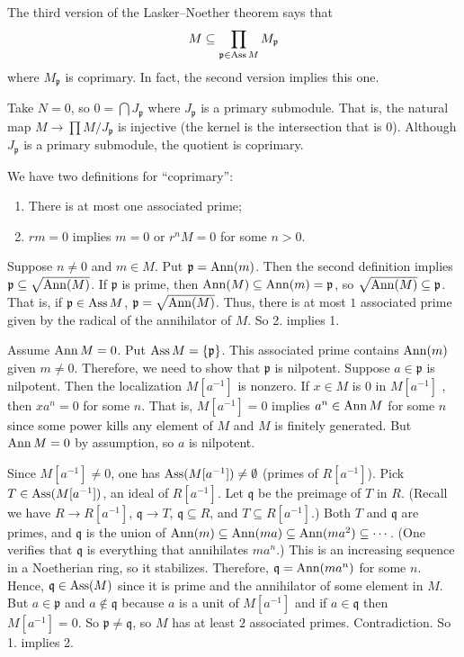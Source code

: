 \documentclass[11pt, oneside,margin=1in]{article}
\begin{document}
The third version of the Lasker--Noether theorem says that
\begin{align*}
	M \subseteq \prod_{\mathfrak{p}\in \operatorname{Ass} M} M_{\mathfrak{p}}
\end{align*}
where $M_{\mathfrak{p}}$ is coprimary. In fact, the second version implies this one. 

Take $N=0$, so $0 = \bigcap J_{\mathfrak{p} }$ where $J_{\mathfrak{p}}$ is a primary submodule. That is, the natural map $M \longrightarrow \prod M/J_{\mathfrak{p}}$ is injective (the kernel is the intersection that is $0$). Although $J_{\mathfrak{p}}$ is a primary submodule, the quotient is coprimary.

We have two definitions for ``coprimary'':
\begin{enumerate}
	\item There is at most one associated prime;
	\item $rm = 0$ implies $m=0$ or $r^nM=0$ for some $n>0$.
\end{enumerate}

Suppose $n\ne 0$ and $m\in M$. Put $\mathfrak{p} = \operatorname{Ann}(m)$. Then the second definition implies $\mathfrak{p} \subseteq \sqrt{\operatorname{Ann} (M)} $. If $\mathfrak{p}$ is prime, then $\operatorname{Ann}(M)\subseteq \operatorname{Ann} (m)= \mathfrak{p}$, so $\sqrt{\operatorname{Ann}(M)}\subseteq \mathfrak{p} $. That is, if $\mathfrak{p}\in \operatorname{Ass} M$, $\mathfrak{p} = \sqrt{\operatorname{Ann} (M)} $. Thus, there is at most $1$ associated prime given by the radical of the annihilator of $M$. So 2. implies 1.

Assume $\operatorname{Ann} M=0$. Put $\operatorname{Ass} M = \{\mathfrak{p}\}$. This associated prime contains $\operatorname{Ann} (m)$ given $m\ne 0$. Therefore, we need to show that $\mathfrak{p}$ is nilpotent. Suppose $a\in \mathfrak{p}$ is nilpotent. Then the localization $M[a^{-1}]$ is nonzero. If $x\in M$ is $0$ in $M[a^{-1}]$ , then $xa^n=0$ for some $n$. That is, $M[a^{-1}]=0$ implies $a^n \in \operatorname{Ann} M$ for some $n$ since some power kills any element of $M$ and $M$ is finitely generated. But $\operatorname{Ann} M=0$ by assumption, so $a$ is nilpotent. 

Since $M[a^{-1}]\ne 0$, one has $\operatorname{Ass} (M[a^{-1}])\ne \emptyset$ (primes of $R[a^{-1}]$). Pick $T\in \operatorname{Ass} (M[a^{-1}])$, an ideal of $R[a^{-1}]$. Let $\mathfrak{q}$ be the preimage of $T$ in $R$. (Recall we have $R\longrightarrow  R[a^{-1}]$, $\mathfrak{q}\longrightarrow T$, $\mathfrak{q}\subseteq R$, and $T\subseteq R[a^{-1}]$.) Both $T$ and $\mathfrak{q}$ are primes, and $\mathfrak{q}$ is the union of $\operatorname{Ann}(m)\subseteq \operatorname{Ann} (ma)\subseteq \operatorname{Ann} (ma^2)\subseteq \cdots$. (One verifies that $\mathfrak{q}$ is everything that annihilates $ma^n$.) This is an increasing sequence in a Noetherian ring, so it stabilizes. Therefore, $\mathfrak{q}=\operatorname{Ann}(ma^n)$ for some $n$. Hence, $\mathfrak{q}\in \operatorname{Ass}(M)$ since it is prime and the annihilator of some element in $M$. But $a\in \mathfrak{p}$ and $a\notin \mathfrak{q}$ because $a$ is a unit of $M[a^{-1}]$ and if $a\in \mathfrak{q}$ then $M[a^{-1}]=0$. So $\mathfrak{p}\ne \mathfrak{q}$, so $M$ has at least $2$ associated primes. Contradiction. So 1. implies 2.
\end{document}
